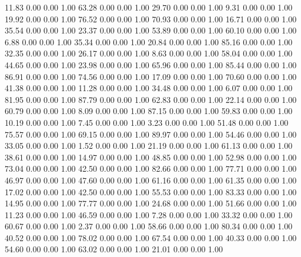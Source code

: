    11.83   0.00   0.00   1.00
   63.28   0.00   0.00   1.00
   29.70   0.00   0.00   1.00
    9.31   0.00   0.00   1.00
   19.92   0.00   0.00   1.00
   76.52   0.00   0.00   1.00
   70.93   0.00   0.00   1.00
   16.71   0.00   0.00   1.00
   35.54   0.00   0.00   1.00
   23.37   0.00   0.00   1.00
   53.89   0.00   0.00   1.00
   60.10   0.00   0.00   1.00
    6.88   0.00   0.00   1.00
   35.34   0.00   0.00   1.00
   20.84   0.00   0.00   1.00
   85.16   0.00   0.00   1.00
   32.35   0.00   0.00   1.00
   26.17   0.00   0.00   1.00
    8.63   0.00   0.00   1.00
   58.04   0.00   0.00   1.00
   44.65   0.00   0.00   1.00
   23.98   0.00   0.00   1.00
   65.96   0.00   0.00   1.00
   85.44   0.00   0.00   1.00
   86.91   0.00   0.00   1.00
   74.56   0.00   0.00   1.00
   17.09   0.00   0.00   1.00
   70.60   0.00   0.00   1.00
   41.38   0.00   0.00   1.00
   11.28   0.00   0.00   1.00
   34.48   0.00   0.00   1.00
    6.07   0.00   0.00   1.00
   81.95   0.00   0.00   1.00
   87.79   0.00   0.00   1.00
   62.83   0.00   0.00   1.00
   22.14   0.00   0.00   1.00
   60.79   0.00   0.00   1.00
    8.09   0.00   0.00   1.00
   87.15   0.00   0.00   1.00
   59.83   0.00   0.00   1.00
   10.19   0.00   0.00   1.00
    7.45   0.00   0.00   1.00
    3.23   0.00   0.00   1.00
   51.48   0.00   0.00   1.00
   75.57   0.00   0.00   1.00
   69.15   0.00   0.00   1.00
   89.97   0.00   0.00   1.00
   54.46   0.00   0.00   1.00
   33.05   0.00   0.00   1.00
    1.52   0.00   0.00   1.00
   21.19   0.00   0.00   1.00
   61.13   0.00   0.00   1.00
   38.61   0.00   0.00   1.00
   14.97   0.00   0.00   1.00
   48.85   0.00   0.00   1.00
   52.98   0.00   0.00   1.00
   73.04   0.00   0.00   1.00
   42.50   0.00   0.00   1.00
   82.66   0.00   0.00   1.00
   77.71   0.00   0.00   1.00
   46.97   0.00   0.00   1.00
   47.60   0.00   0.00   1.00
   61.16   0.00   0.00   1.00
   61.35   0.00   0.00   1.00
   17.02   0.00   0.00   1.00
   42.50   0.00   0.00   1.00
   55.53   0.00   0.00   1.00
   83.33   0.00   0.00   1.00
   14.95   0.00   0.00   1.00
   77.77   0.00   0.00   1.00
   24.68   0.00   0.00   1.00
   51.66   0.00   0.00   1.00
   11.23   0.00   0.00   1.00
   46.59   0.00   0.00   1.00
    7.28   0.00   0.00   1.00
   33.32   0.00   0.00   1.00
   60.67   0.00   0.00   1.00
    2.37   0.00   0.00   1.00
   58.66   0.00   0.00   1.00
   80.34   0.00   0.00   1.00
   40.52   0.00   0.00   1.00
   78.02   0.00   0.00   1.00
   67.54   0.00   0.00   1.00
   40.33   0.00   0.00   1.00
   54.60   0.00   0.00   1.00
   63.02   0.00   0.00   1.00
   21.01   0.00   0.00   1.00
